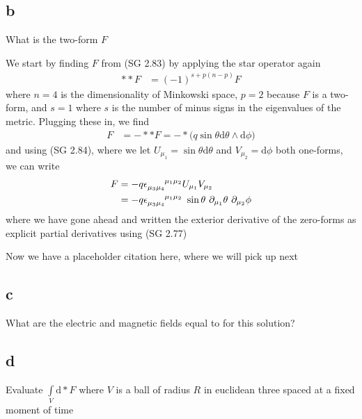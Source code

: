 \subsection{b}
What is the two-form $F$ 

We start by finding $F$ from (SG 2.83) by applying the star operator again
%
\begin{align}
\ast \ast F &= (-1)^{s + p\left(n-p\right)} F
\end{align} 
%
where $n = 4$ is the dimensionality of Minkowski space, $p=2$ because $F$ is a two-form, and $s=1$ where $s$ is the number of minus signs in the eigenvalues of the metric. Plugging these in, we find  
%
\begin{align}
F &= - \ast \ast F = - \ast \big( q \sin{\theta}  \textrm{d} \theta  \wedge  \textrm{d} \phi \big)
\end{align} 
%
and using (SG 2.84), where we let $U_{\mu_1} = \sin{\theta}  \textrm{d} \theta$ and $V_{\mu_2} =  \textrm{d} \phi$ both one-forms, we can write 
%
\begin{align}
F &= - q \epsilon\indices{_{\mu_3 \mu_4}^{\mu_1 \mu_2}} U_{\mu_1} V_{\mu_2} \\
&= - q \epsilon\indices{_{\mu_3 \mu_4}^{\mu_1 \mu_2}} \ \sin{\theta} \ \partial_{\mu_1} \theta \ \partial_{\mu_2} \phi
\end{align} 
%
where we have gone ahead and written the exterior derivative of the zero-forms as explicit partial derivatives using (SG 2.77) 

Now we have a placeholder citation here, where we will pick up next \cite{Wiki:1}


\subsection{c}
What are the electric and magnetic fields equal to for this solution? 

\subsection{d}
Evaluate $ \int\limits_{V} \textrm{d} \ast F $ where $V$ is a ball of radius $R$ in euclidean three spaced at a fixed moment of time